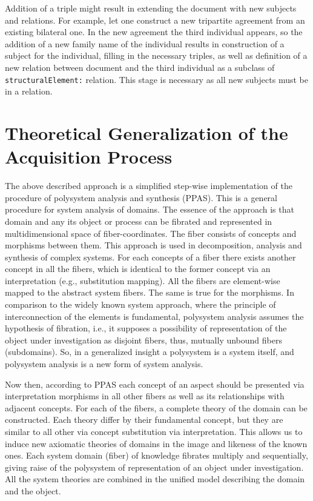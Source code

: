 \documentclass[conference]{IEEEtran}
\begin{document}
Addition of a triple might result in extending the document with new
subjects and relations.  For example, let one construct a new tripartite
agreement from an existing bilateral one.  In the new agreement the
third individual appears, so the addition of a new family name of the
individual results in construction of a subject for the individual,
filling in the necessary triples, as well as definition of a new
relation between document and the third individual as a subclass of
\texttt{structuralElement:} relation.  This stage is necessary as all
new subjects must be in a relation.

\section{Theoretical Generalization of the Acquisition Process}

The above described approach is a simplified step-wise implementation
of the procedure of polysystem analysis and synthesis \cite{father}
(PPAS).  This is a general procedure for system analysis of domains.
The essence of the approach is that domain and any its object or
process can be fibrated and represented in multidimensional space of
fiber-coordinates.  The fiber consists of concepts and morphisms
between them.  This approach is used in decomposition, analysis and
synthesis of complex systems.  For each concepts of a fiber there
exists another concept in all the fibers, which is identical to the
former concept via an interpretation (e.g., substitution mapping).
All the fibers are element-wise mapped to the abstract system fibers.
The same is true for the morphisms.  In comparison to the widely known
system approach, where the principle of interconnection of the
elements is fundamental, polysystem analysis assumes the hypothesis of
fibration, i.e., it supposes a possibility of representation of the
object under investigation as disjoint fibers, thus, mutually unbound
fibers (subdomains).  So, in a generalized insight a polysystem is a
system itself, and polysystem analysis is a new form of system
analysis.

Now then, according to PPAS \cite{father} each concept of an aspect
should be presented via interpretation morphisms in all other fibers
as well as its relationships with adjacent concepts.  For each of the
fibers, a complete theory of the domain can be constructed.  Each
theory differ by their fundamental concept, but they are similar to
all other via concept substitution via interpretation.  This allows us
to induce new axiomatic theories of domains in the image and likeness
of the known ones.  Each system domain (fiber) of knowledge fibrates
multiply and sequentially, giving raise of the polysystem of
representation of an object under investigation.  All the system
theories are combined in the unified model describing the domain and
the object.
\end{document}
